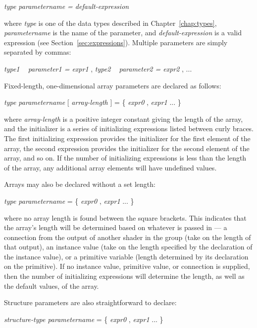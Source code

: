 \documentclass[11pt,letterpaper]{book}
\begin{document}
\medskip
\spc \emph{type parametername = default-expression} 
\medskip

\noindent where \emph{type} is one of the data types described
in Chapter~\ref{chap:types}, \emph{parametername} is the name of the
parameter, and \emph{default-expression} is a valid expression
(see Section~\ref{sec:expressions}).  Multiple parameters are 
simply separated by commas:

\medskip
\spc \emph{type1 ~ parameter1 = expr1} {\cf ,} \emph{type2 ~ parameter2 = expr2} {\cf ,} ...
\medskip


Fixed-length, one-dimensional array parameters are declared as follows:

\medskip
\spc \emph{type parametername} {\cf [ } \emph{array-length} {\cf ] = \{ } \emph{expr0}
  {\cf ,} \emph{expr1} ... {\cf \} }
\medskip

\noindent where \emph{array-length} is a positive integer constant
giving the length of the array, and the initializer is a series of
initializing expressions listed between curly braces.  The first
initializing expression provides the initializer for the first element
of the array, the second expression provides the initializer for the
second element of the array, and so on.  If the number of initializing
expressions is less than the length of the array, any additional array
elements will have undefined values.

Arrays may also be declared without a set length:

\medskip
\spc \emph{type parametername} {\cf [ ] = \{ } \emph{expr0}
  {\cf ,} \emph{expr1} ... {\cf \} }
\medskip

\noindent where no array length is found between the square brackets.
This indicates that the array's length will be determined based on
whatever is passed in --- a connection from the output of another shader
in the group (take on the length of that output), an instance value
(take on the length specified by the declaration of the instance value),
or a primitive variable (length determined by its declaration on the
primitive).  If no instance value, primitive value, or connection is
supplied, then the number of initializing expressions will determine the
length, as well as the default values, of the array.

Structure parameters are also straightforward to declare:

\medskip
\spc \emph{structure-type parametername} {\cf = \{ } \emph{expr0}
  {\cf ,} \emph{expr1} ... {\cf \} }
\medskip
\end{document}

